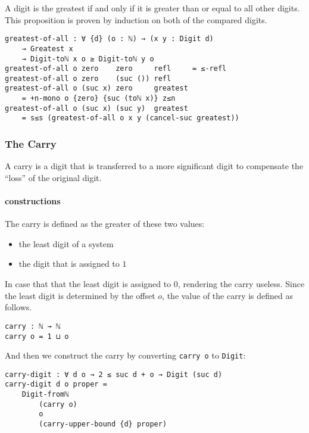 \documentclass[\main/thesis.tex]{subfiles}
\begin{document}
A digit is the greatest if and only if it is greater than or equal to all other
digits. This proposition is proven by induction on both of the compared digits.

\begin{lstlisting}
greatest-of-all : ∀ {d} (o : ℕ) → (x y : Digit d)
    → Greatest x
    → Digit-toℕ x o ≥ Digit-toℕ y o
greatest-of-all o zero    zero     refl     = ≤-refl
greatest-of-all o zero    (suc ()) refl
greatest-of-all o (suc x) zero     greatest
    = +n-mono o {zero} {suc (toℕ x)} z≤n
greatest-of-all o (suc x) (suc y)  greatest
    = s≤s (greatest-of-all o x y (cancel-suc greatest))
\end{lstlisting}

\subsubsection{The Carry}

A carry is a digit that is transferred to a more significant digit to compensate
the ``loss'' of the original digit.

\paragraph{constructions}

The carry is defined as the greater of these two values:

\begin{itemize}
    \item the least digit of a system
    \item the digit that is assigned to $ 1 $
\end{itemize}

In case that that the least digit is assigned to $ 0 $, rendering the carry useless.
Since the least digit is determined by the offset $ o $, the value of the carry
is defined as follows.

\begin{lstlisting}
carry : ℕ → ℕ
carry o = 1 ⊔ o
\end{lstlisting}

And then we construct the carry by converting {\lstinline|carry o|} to {\lstinline|Digit|}:

\begin{lstlisting}
carry-digit : ∀ d o → 2 ≤ suc d + o → Digit (suc d)
carry-digit d o proper =
    Digit-fromℕ
        (carry o)
        o
        (carry-upper-bound {d} proper)
\end{lstlisting}
\end{document}
